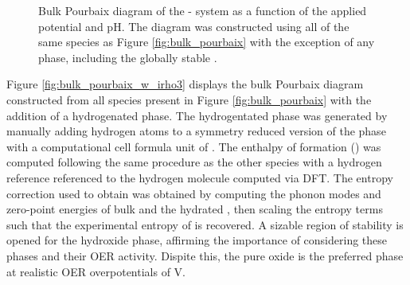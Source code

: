 \begin{figure}[!htb]
\centering
{}
\caption{\label{fig:bulk_pourbaix_wo_alpha}
%
Bulk Pourbaix diagram of the - system as a function of the applied potential and pH.
%
The diagram was constructed using all of the same species as Figure \ref{fig:bulk_pourbaix} with the exception of any \IrOthree phase, including the globally stable \aIrOthree.
}
\end{figure}


%
%
Figure \ref{fig:bulk_pourbaix_w_irho3} displays the bulk Pourbaix diagram constructed from all species present in Figure \ref{fig:bulk_pourbaix} with the addition of a hydrogenated \aIrOthree phase.
%
The hydrogentated phase was generated by manually adding hydrogen atoms to a symmetry reduced version of the \aIrOthree phase with a computational cell formula unit of .
%
The enthalpy of formation (\DHf) was computed following the same procedure as the other species with a hydrogen reference referenced to the hydrogen molecule computed via DFT.
%
The entropy correction used to obtain \DGf was
obtained by computing the phonon modes and zero-point energies of bulk \rIrOtwo and the hydrated \aIrOthree, then scaling the entropy terms such that the experimental entropy of \rIrOtwo is recovered.
%
A sizable region of stability is opened for the hydroxide \aIrOthree phase,
affirming the importance of considering these phases and their OER activity.
%
Dispite this, the pure oxide \aIrOthree is the preferred phase at realistic OER overpotentials of  V.


